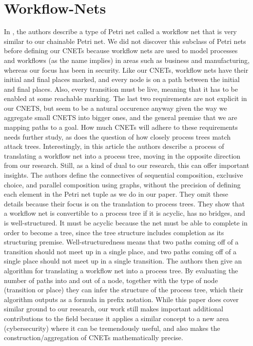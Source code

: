 \section{Workflow-Nets}
In \cite{2013CaCA}, the authors describe a type of Petri net called a workflow net that is very similar to our chainable Petri net. We did not discover this subclass of Petri nets before defining our CNETs because workflow nets are used to model processes and workflows (as the name implies) in areas such as business and manufacturing, whereas our focus has been in security. Like our CNETs, workflow nets have their initial and final places marked, and every node is on a path between the initial and final places. Also, every transition must be live, meaning that it has to be enabled at some reachable marking. The last two requirements are not explicit in our CNETS, but seem to be a natural occurence anyway given the way we aggregate small CNETS into bigger ones, and the general premise that we are mapping paths to a goal. How much CNETs will adhere to these requirements needs further study, as does the question of how closely process trees match attack trees. Interestingly, in this article the authors describe a process of translating a workflow net into a process tree, moving in the opposite direction from our research. Still, as a kind of dual to our research, this can offer important insights. The authors define the connectives of sequential composition, exclusive choice, and parallel composition using graphs, without the precision of defining each element in the Petri net tuple as we do in our paper. They omit these details because their focus is on the translation to process trees. They show that a workflow net is convertible to a process tree if it is acyclic, has no bridges, and is well-structured. It must be acyclic because the net must be able to complete in order to become a tree, since the tree structure includes completion as its structuring premise. Well-structuredness means that two paths coming off of a transition should not meet up in a single place, and two paths coming off of a single place should not meet up in a single transition. The authors then give an algorithm for translating a workflow net into a process tree. By evaluating the number of paths into and out of a node, together with the type of node (transition or place) they can infer the structure of the process tree, which their algorithm outputs as a formula in prefix notation. While this paper does cover similar ground to our research, our work still makes important additional contributions to the field because it applies a similar concept to a new area (cybersecurity) where it can be tremendously useful, and also makes the construction/aggregation of CNETs mathematically precise.  
\par 

\nocite{*}




